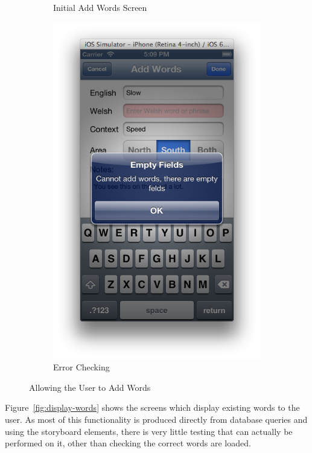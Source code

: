 \documentclass[11pt, a4paper]{article}
\begin{document}
\begin{figure}[h]
\begin{subfigure}[b]{0.3\textwidth}
\caption{Initial Add Words Screen}
\end{subfigure}
\begin{subfigure}[b]{0.3\textwidth}
\includegraphics[width=\textwidth]{img/add-word-error}
\caption{Error Checking}
\end{subfigure}
\caption{Allowing the User to Add Words}
\label{fig:add-words}
\end{figure}

Figure~\ref{fig:display-words} shows the screens which display existing words to the user. As most of this functionality is produced directly from database queries and using the storyboard elements, there is very little testing that can actually be performed on it, other than checking the correct words are loaded.
\end{document}
